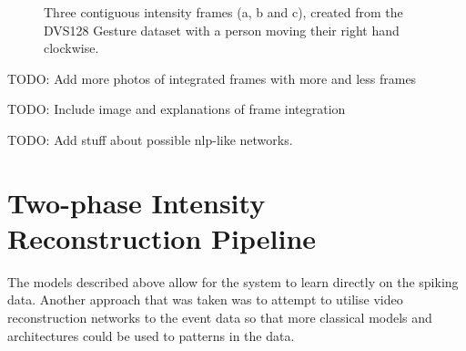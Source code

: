 \begin{figure}[htb]%
    \centering
    \qquad
    \qquad
    \caption{Three contiguous intensity frames ({a}, {b} and {c}), created from the DVS128 Gesture dataset with a person moving their right hand clockwise.}%
    \label{fig:dvs128_integrated_frames}%
\end{figure}

\color{red} TODO: Add more photos of integrated frames with more and less frames \color{black}

\color{red} TODO: Include image and explanations of frame integration \color{black}

\color{red} TODO: Add stuff about possible nlp-like networks. \color{black}


\section{Two-phase Intensity Reconstruction Pipeline}

The models described above allow for the system to learn directly on the spiking data. Another approach that was taken was to attempt to utilise video reconstruction networks to the event data so that more classical models and architectures could be used to patterns in the data.


